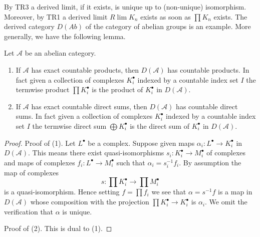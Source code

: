 \noindent
By TR3 a derived limit, if it exists, is unique up to (non-unique)
isomorphism. Moreover, by TR1 a derived limit $R\lim K_n$ exists
as soon as $\prod K_n$ exists. The derived category $D(\textit{Ab})$
of the category of abelian groups is an example. More generally,
we have the following lemma.

\begin{lemma}
\label{lemma-product-derived-Ab4*}
Let $\mathcal{A}$ be an abelian category.
\begin{enumerate}
\item If $\mathcal{A}$ has exact countable products, then
$D(\mathcal{A})$ has countable products. In fact given
a collection of complexes $K_i^\bullet$ indexed by a countable index set $I$
the termwise product $\prod K_i^\bullet$
is the product of $K_i^\bullet$ in $D(\mathcal{A})$.
\item If $\mathcal{A}$ has exact countable direct sums, then
$D(\mathcal{A})$ has countable direct sums. In fact given
a collection of complexes $K_i^\bullet$ indexed by a countable
index set $I$ the termwise direct sum $\bigoplus K_i^\bullet$
is the direct sum of $K_i^\bullet$ in $D(\mathcal{A})$.
\end{enumerate}
\end{lemma}

\begin{proof}
Proof of (1). Let $L^\bullet$ be a complex. Suppose given maps
$\alpha_i : L^\bullet \to K_i^\bullet$ in $D(\mathcal{A})$.
This means there exist quasi-isomorphisms $s_i : K_i^\bullet \to M_i^\bullet$
of complexes and maps of complexes $f_i : L^\bullet \to M_i^\bullet$
such that $\alpha_i = s_i^{-1}f_i$. By assumption the map of complexes
$$
s : \prod K_i^\bullet \longrightarrow \prod M_i^\bullet
$$
is a quasi-isomorphism. Hence setting $f = \prod f_i$ we see that
$\alpha = s^{-1}f$ is a map in $D(\mathcal{A})$ whose composition
with the projection $\prod K_i^\bullet \to K_i^\bullet$ is $\alpha_i$.
We omit the verification that $\alpha$ is unique.

\medskip\noindent
Proof of (2). This is dual to (1).
\end{proof}













